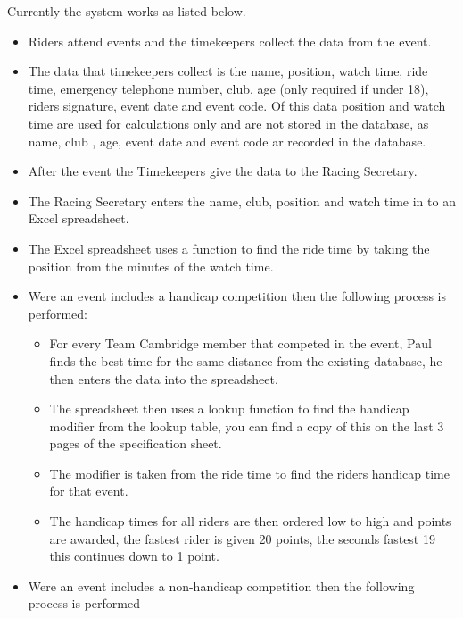 Currently the system works as listed below.
\begin{itemize}
	\item Riders attend events and the timekeepers collect the data from the event.
	
	\item The data that timekeepers collect is the name, position, watch time, ride time, emergency
	 telephone number, club, age (only required if under 18), riders signature, event date and event code. Of this data position and watch time are used for calculations only and are not stored in the database, as name, club , age, event date and event code ar recorded in the database.
	 
	\item After the event the Timekeepers give the data to the Racing Secretary.
	
	\item The Racing Secretary enters the name, club, position and watch time in to an Excel spreadsheet.
	
	\item The Excel spreadsheet uses a function to find the ride time by taking the position from the minutes of the watch time.
	
	\item Were an event includes a handicap competition then the following process is performed:
	
	\begin{itemize}
	\item For every Team Cambridge member that competed in the event, Paul finds the best time for the same distance from the existing database, he then enters the data into the spreadsheet.
	
	\item The spreadsheet then uses a lookup function to find the handicap modifier from the lookup table, you can find a copy of this on the last 3 pages of the specification sheet.
	
	\item The modifier is taken from the ride time to find the riders handicap time for that event.
	
	\item The handicap times for all riders are then ordered low to high and points are awarded, the fastest rider is given 20 points, the seconds fastest 19 this continues down to 1 point.
	\end{itemize}
	
	\item Were an event includes a non-handicap competition then the following process is performed
	

\end{itemize}

